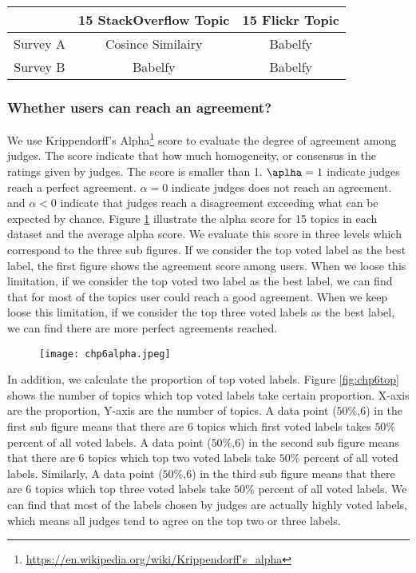 \begin{table}[htp]
\centering
\begin{tabular}{c|c|c}
\hline
             &  15 StackOverflow Topic& 15 Flickr Topic \\ \hline
    Survey A & Cosince Similairy & Babelfy\\ \hline  
    Survey B &  Babelfy          & Babelfy\\ \hline
\end{tabular}
\label{tab:chp6survey}
\end{table}


\subsubsection{Whether users can reach an agreement?}
We use Krippendorff’s Alpha\footnote{\url{https://en.wikipedia.org/wiki/Krippendorff's_alpha}} score to evaluate the degree of agreement among judges. The score indicate that how much homogeneity, or consensus in the ratings given by judges. The score is smaller than 1. $\aplha = 1 $ indicate judges reach a perfect agreement. $\alpha =0 $ indicate judges does not reach an agreement. and $\alpha <0 $ indicate that judges reach a disagreement exceeding what can be expected by chance.  Figure \ref{fig:chp6alpha} illustrate the alpha score for 15 topics in each dataset and the average alpha score. We evaluate this score in three levels which correspond to the three sub figures. If we consider the top voted label as the best label, the first figure shows the agreement score among users. When we loose this limitation, if we consider the top voted two label as the best label, we can find that for most of the topics user could reach a good agreement. When we keep loose this limitation, if we consider the top three voted labels as the best label, we can find there are more perfect agreements reached. 



\begin{figure}[htp]
\centering
\texttt{[image: chp6alpha.jpeg]}  
\caption{}
\label{fig:chp6alpha} 
\end{figure}


In addition, we calculate the proportion of top voted labels. Figure \ref{fig:chp6top} shows the number of topics which top voted labels take certain proportion. X-axis are the proportion, Y-axis are the number of topics. A data point ($50\%$,6) in the first sub figure means that there are 6 topics which first voted labels takes $50\%$ percent of all voted labels. A data point ($50\%$,6) in the second sub figure means that there are 6 topics which top two voted labels take $50\%$ percent of all voted labels. Similarly, A data point ($50\%$,6) in the third sub figure means that there are 6 topics which top three voted labels take $50\%$ percent of all voted labels. We can find that most of the labels chosen by judges are actually highly voted labels, which means all judges tend to agree on the top two or three labels.

